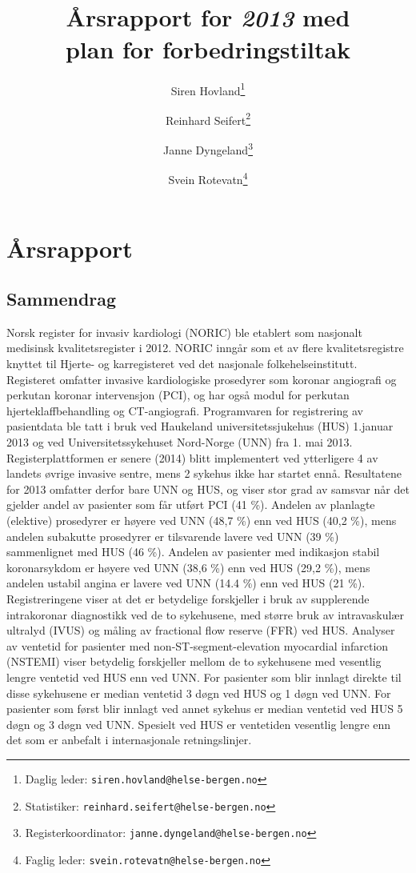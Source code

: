 \documentclass[norsk, a4paper]{report}
\title{\registernavn \\ \textbf{Årsrapport for \textit{2013} med \\
plan for forbedringstiltak}}
\author[$\dag$]{Siren Hovland\thanks{Daglig leder: \texttt{siren.hovland@helse-bergen.no}}}
\author[$\dag$]{Reinhard Seifert\thanks{Statistiker: \texttt{reinhard.seifert@helse-bergen.no}}}
\author[$\dag$]{Janne Dyngeland\thanks{Registerkoordinator: \texttt{janne.dyngeland@helse-bergen.no}}}
\author[$\dag$]{Svein Rotevatn\thanks{Faglig leder: \texttt{svein.rotevatn@helse-bergen.no}}}
\affil[$\dag$]{NORIC\\Norsk register for invasiv kardiologi \\
Haukeland universitetssjukehus \\
Hjerteavdelingen \\
Postboks 1400 \\
Jonas Lies vei 65 \\
5021 Bergen \\
epost \texttt{noric@helse-bergen.no} \\
Telefon 55 97 22 20}
\begin{document}
\maketitle


\tableofcontents


\part{Årsrapport}\label{par:rap}
\thispagestyle{empty}


\chapter{Sammendrag}
Norsk register for invasiv kardiologi (NORIC) ble etablert som nasjonalt medisinsk kvalitetsregister i 2012. NORIC inngår som et av flere kvalitetsregistre knyttet til Hjerte- og karregisteret ved det nasjonale folkehelseinstitutt. Registeret omfatter invasive kardiologiske prosedyrer som koronar angiografi og perkutan koronar intervensjon (PCI), og har også modul for perkutan hjerteklaffbehandling og CT-angiografi.
Programvaren for registrering av pasientdata ble tatt i bruk ved Haukeland universitetssjukehus (HUS) 1.januar 2013 og ved Universitetssykehuset Nord-Norge (UNN) fra 1. mai 2013. Registerplattformen er senere (2014) blitt implementert ved ytterligere 4 av landets øvrige invasive sentre, mens 2 sykehus ikke har startet ennå.
Resultatene for 2013 omfatter derfor bare UNN og HUS, og viser stor grad av samsvar når det gjelder andel av pasienter som får utført PCI (41 \%). Andelen av planlagte (elektive) prosedyrer er høyere ved UNN (48,7 \%) enn ved HUS (40,2 \%), mens andelen subakutte prosedyrer er tilsvarende lavere ved UNN (39 \%) sammenlignet med HUS (46 \%). Andelen av pasienter med indikasjon stabil koronarsykdom er høyere ved UNN (38,6 \%) enn ved HUS (29,2 \%), mens andelen ustabil angina er lavere ved UNN (14.4 \%) enn ved HUS (21 \%). Registreringene viser at det er betydelige forskjeller i bruk av supplerende intrakoronar diagnostikk ved de to sykehusene, med større bruk av intravaskulær ultralyd (IVUS) og måling av fractional flow reserve (FFR) ved HUS. 
Analyser av ventetid for pasienter med non-ST-segment-elevation myocardial infarction (NSTEMI) viser betydelig forskjeller mellom de to sykehusene med vesentlig lengre ventetid ved HUS enn ved UNN. For pasienter som blir innlagt direkte til disse sykehusene er median ventetid 3 døgn ved HUS og 1 døgn ved UNN. For pasienter som først blir innlagt ved annet sykehus er median ventetid ved HUS 5 døgn og 3 døgn ved UNN. Spesielt ved HUS er ventetiden vesentlig lengre enn det som er anbefalt i internasjonale retningslinjer.
\end{document}
